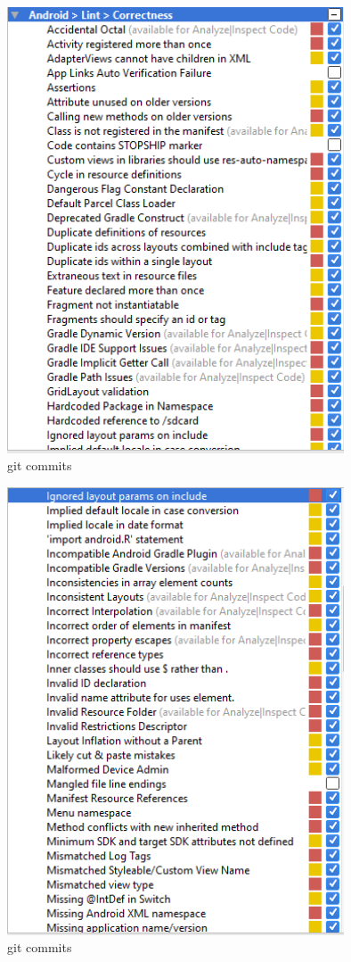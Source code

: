 \begin{figure}[H]
  		\centering
      	\includegraphics[width=100mm]{Capture11}	      	
  		\caption{git commits}
\end{figure}

\begin{figure}[H]
  		\centering
      	\includegraphics[width=100mm]{Capture12}	      	
  		\caption{git commits}
\end{figure}

